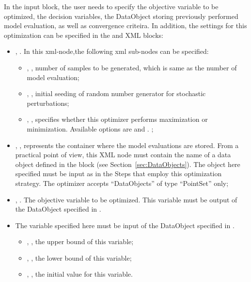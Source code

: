 In the  input block, the user needs to specify the objective variable to be optimized, the decision variables, the DataObject storing previously performed model evaluation, as well as convergence criteira. In addition, the settings for this optimization can be specified in the  and  XML blocks:
\begin{itemize}
\item {},  . In this xml-node,the following xml sub-nodes can be specified:
  \begin{itemize}
    \item {}, , number of samples to be generated, which is same as the number of model evaluation;
    \item {}, , initial seeding of random number generator for stochastic perturbations;
    \item {},  , specifies whether this optimizer performs maximization or minimization. Available options are  and .
    ;
  \end{itemize}
\end{itemize}
\begin{itemize}
\item {}, ,
        represents the container where the model evaluations are stored.
        From a practical point of view, this XML node must contain the name of
        a data object defined in the  block (see
        Section~\ref{sec:DataObjects}). The object here specified must be
        input as   in the Steps that employ this optimization strategy.
        The  optimizer accepts ``DataObjects'' of type ``PointSet'' only;
\item {}, . The objective variable to be optimized. This variable must be output of the DataObject specified in .
\end{itemize}
\begin{itemize}
\item \variableDescription
 The variable specified here must be input of the DataObject specified in .
 \variableChildrenIntro
 \begin{itemize}
    \item {}, , the upper bound of this variable;
    \item {}, , the lower bound of this variable;
    \item {}, , the initial value for this variable.
  \end{itemize}
\end{itemize}
